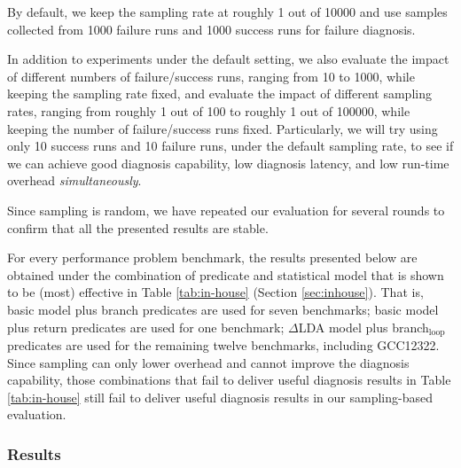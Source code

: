 By default, we keep the sampling rate at roughly
1 out of 10000
and use samples
collected from 1000 failure runs and 1000 success runs for failure diagnosis. 

In addition to experiments under the default setting, we also evaluate the 
impact of different numbers of failure/success runs, ranging from 10 to 1000,
while keeping the sampling rate fixed, and evaluate the impact of different
sampling rates, ranging from roughly 1 out of 100 to roughly 1 out of 100000,
while keeping the number of failure/success runs fixed.
Particularly, we will try using only 10 success runs
and 10 failure runs, under the default sampling rate, to see if we can achieve 
good diagnosis capability,
low diagnosis latency, and low run-time overhead \emph{simultaneously}. 

Since sampling is random, we have repeated our evaluation for several rounds to confirm that all
the presented results are stable.

For every performance problem benchmark, the results presented below are 
obtained under the
combination of predicate and statistical model that is shown to be (most) 
effective
in Table \ref{tab:in-house} (Section \ref{sec:inhouse}).
That is, basic model plus branch predicates are used for seven benchmarks;
basic model plus return predicates are used for one benchmark;
$\Delta$LDA model plus branch$_{\text{loop}}$ predicates are used for the remaining twelve  
benchmarks, including GCC12322.
Since sampling can only lower overhead and cannot
improve the diagnosis capability, those combinations that fail to deliver
useful diagnosis results in Table \ref{tab:in-house} still fail to deliver
useful diagnosis results in our sampling-based evaluation.

\subsubsection{Results}

